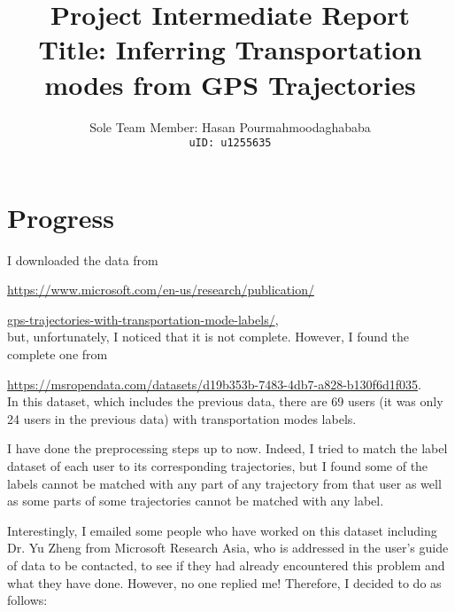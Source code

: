 \documentclass[11pt]{myclass}
\begin{document}
\title{Project Intermediate Report \\ Title: Inferring Transportation modes from GPS Trajectories}

\author{Sole Team Member: Hasan Pourmahmoodaghababa \\ %
\texttt{uID: u1255635}}




\maketitle

\section{Progress}

I downloaded the data from 

\url{https://www.microsoft.com/en-us/research/publication/}

\hspace{1.3cm} \url{gps-trajectories-with-transportation-mode-labels/}, \\
but, unfortunately, I noticed that it is not complete. However, I found the complete one from 

\url{https://msropendata.com/datasets/d19b353b-7483-4db7-a828-b130f6d1f035}. \\
In this dataset, which includes the previous data, there are 69 users (it was only 24 users in the previous data) with transportation modes labels. 

I have done the preprocessing steps up to now. Indeed, I tried to match the label dataset of each user to its corresponding trajectories, but I found some of the labels cannot be matched with any part of any trajectory from that user as well as some parts of some trajectories cannot be matched with any label. 

Interestingly, I emailed some people who have worked on this dataset including Dr. Yu Zheng from Microsoft Research Asia, who is addressed in the user's guide of data to be contacted, to see if they had already encountered this problem and what they have done. However, no one replied me! Therefore, I decided to do as follows: 
\end{document}
